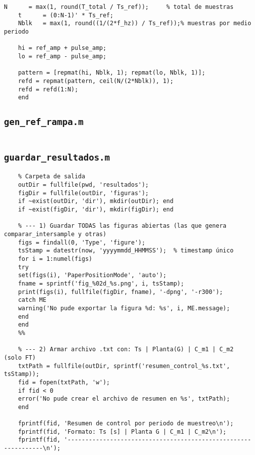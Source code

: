 {\begin{lstlisting}[style=matlabstyle,caption={Generador de referencia por pulsos (bloques).}]
	N      = max(1, round(T_total / Ts_ref));     % total de muestras
	t      = (0:N-1)' * Ts_ref;
	Nblk   = max(1, round((1/(2*f_hz)) / Ts_ref));% muestras por medio periodo
	
	hi = ref_amp + pulse_amp;
	lo = ref_amp - pulse_amp;
	
	pattern = [repmat(hi, Nblk, 1); repmat(lo, Nblk, 1)];
	refd = repmat(pattern, ceil(N/(2*Nblk)), 1);
	refd = refd(1:N);
	end
\end{lstlisting}

\subsection{\texttt{gen\_ref\_rampa.m}}
\begin{lstlisting}[style=matlabstyle,caption={Generador de referencia tipo rampa.}]
	% === Pegar aquí el contenido de gen_ref_rampa.m ===
\end{lstlisting}

\subsection{\texttt{guardar\_resultados.m}}
\begin{lstlisting}[style=matlabstyle,caption={Guardado de resultados y figuras.}]
	%% ================== Guardar figuras e informe ==================
	% Carpeta de salida
	outDir = fullfile(pwd, 'resultados');
	figDir = fullfile(outDir, 'figuras');
	if ~exist(outDir, 'dir'), mkdir(outDir); end
	if ~exist(figDir, 'dir'), mkdir(figDir); end
	
	% --- 1) Guardar TODAS las figuras abiertas (las que genera comparar_intersample y otras)
	figs = findall(0, 'Type', 'figure');
	tsStamp = datestr(now, 'yyyymmdd_HHMMSS');  % timestamp único
	for i = 1:numel(figs)
	try
	set(figs(i), 'PaperPositionMode', 'auto');
	fname = sprintf('fig_%02d_%s.png', i, tsStamp);
	print(figs(i), fullfile(figDir, fname), '-dpng', '-r300');
	catch ME
	warning('No pude exportar la figura %d: %s', i, ME.message);
	end
	end
	%%
	
	% --- 2) Armar archivo .txt con: Ts | Planta(G) | C_m1 | C_m2 (solo FT)
	txtPath = fullfile(outDir, sprintf('resumen_control_%s.txt', tsStamp));
	fid = fopen(txtPath, 'w');
	if fid < 0
	error('No pude crear el archivo de resumen en %s', txtPath);
	end
	
	fprintf(fid, 'Resumen de control por periodo de muestreo\n');
	fprintf(fid, 'Formato: Ts [s] | Planta G | C_m1 | C_m2\n');
	fprintf(fid, '---------------------------------------------------------------\n');
	

\end{lstlisting}}

